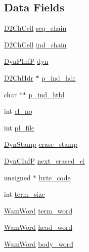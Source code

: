 \subsection*{Data Fields}
\begin{DoxyCompactItemize}
\item 
\hyperlink{structD2ChCell}{D2\+Ch\+Cell} \hyperlink{structdyncinf_a7761fb1d761320cf1779e333348690a1}{seq\+\_\+chain}
\item 
\hyperlink{structD2ChCell}{D2\+Ch\+Cell} \hyperlink{structdyncinf_a13ff7af2c35333e6fca1f40ab6299a20}{ind\+\_\+chain}
\item 
\hyperlink{dynam__supp_8h_a23ac55128ef278dc030519f2aea275bd}{Dyn\+P\+InfP} \hyperlink{structdyncinf_a357682e414c932a33d29142f4f3ffc3b}{dyn}
\item 
\hyperlink{structD2ChHdr}{D2\+Ch\+Hdr} $\ast$ \hyperlink{structdyncinf_ad7f2e30b3f0537ad3587209d9f3cc11a}{p\+\_\+ind\+\_\+hdr}
\item 
char $\ast$$\ast$ \hyperlink{structdyncinf_ac365b7b37b1046432be9fc713bd56ec2}{p\+\_\+ind\+\_\+htbl}
\item 
int \hyperlink{structdyncinf_a9ecec5cb558eff437ebc9dad0b9a713a}{cl\+\_\+no}
\item 
int \hyperlink{structdyncinf_a8eb75fc2f5558e0fe27a7307dda56f2e}{pl\+\_\+file}
\item 
\hyperlink{dynam__supp_8h_ae67d7fd7d828834bf168a2bccc22643c}{Dyn\+Stamp} \hyperlink{structdyncinf_af4fd2ada2161206351d5d7b462fdf168}{erase\+\_\+stamp}
\item 
\hyperlink{dynam__supp_8h_ae9665ae9a3ee194834c9995b875aed48}{Dyn\+C\+InfP} \hyperlink{structdyncinf_a1570173ffbae298cc0c7916bd835f675}{next\+\_\+erased\+\_\+cl}
\item 
unsigned $\ast$ \hyperlink{structdyncinf_a8a16574f97f5162a42cf11f74b16d6b3}{byte\+\_\+code}
\item 
int \hyperlink{structdyncinf_a4b49c8e104c686701eb19ca0d01173e7}{term\+\_\+size}
\item 
\hyperlink{LINUX__SIGSEGV_8c_a10ea8be8823feb38875b8a9326cbb424}{Wam\+Word} \hyperlink{structdyncinf_aad9f2ad962d3ca3002a6fc97dc375d0b}{term\+\_\+word}
\item 
\hyperlink{LINUX__SIGSEGV_8c_a10ea8be8823feb38875b8a9326cbb424}{Wam\+Word} \hyperlink{structdyncinf_a11e4b16031cc5023d2f6d2194e328b89}{head\+\_\+word}
\item 
\hyperlink{LINUX__SIGSEGV_8c_a10ea8be8823feb38875b8a9326cbb424}{Wam\+Word} \hyperlink{structdyncinf_aaab182b28b71abea34aa78e530aa9483}{body\+\_\+word}
\end{DoxyCompactItemize}


